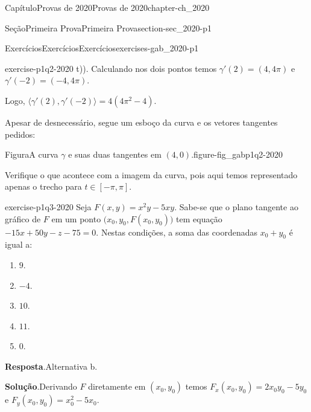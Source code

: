 \documentclass[oneside,10pt,]{book}
\newcommand{\blocktitlefont}{\relax}
\numberwithin{equation}{section}
\begin{document}
\begin{chapterptx}{Capítulo}{Provas de 2020}{}{Provas de 2020}{}{}{chapter-ch_2020}
\begin{sectionptx}{Seção}{Primeira Prova}{}{Primeira Prova}{}{}{section-sec_2020-p1}
\begin{exercises-subsection-numberless}{Exercícios}{Exercícios}{}{Exercícios}{}{}{exercises-gab_2020-p1}
\begin{divisionexercise}{2}{}{}{exercise-p1q2-2020}
t)\big)\). Calculando nos dois pontos temos \(\gamma'(2)=(4,4\pi)\) e \(\gamma'(-2)=(-4,4\pi)\).%
\par
Logo, \(\big\langle\gamma'(2),\gamma'(-2)\big\rangle=4(4\pi^2-4)\).%
\par
Apesar de desnecessário, segue um esboço da curva e os vetores tangentes pedidos: \begin{figureptx}{Figura}{A curva \(\gamma\) e suas duas tangentes em \((4,0)\).}{figure-fig_gabp1q2-2020}{}%
\begin{image}{0.25}{0.5}{0.25}{}%
%
\end{image}%
\tcblower
\end{figureptx}%
%
\par
Verifique o que acontece com a imagem da curva, pois aqui temos representado apenas o trecho para \(t\in[-\pi,\pi]\).%
\end{divisionexercise}%
\begin{divisionexercise}{3}{}{}{exercise-p1q3-2020}%
Seja \(F(x,y)=x^2y-5xy\). Sabe-se que o plano tangente ao gráfico de \(F\) em um ponto \(\big(x_0,y_0,F(x_0,y_0)\big)\) tem equação \(-15x+50y-z-75=0\). Nestas condições, a soma das coordenadas \(x_0+y_0\) é igual a:%
\begin{multicols}{5}
\begin{enumerate}[label=\alph*]
\item{}\(9\).%
\item{}\(-4\).%
\item{}\(10\).%
\item{}\(11\).%
\item{}\(0\).%
\end{enumerate}
\end{multicols}
%
\par\smallskip%
\noindent\textbf{\blocktitlefont Resposta}.\hypertarget{answer-p1q3-2020-b}{}\quad{}Alternativa b.%
\par\smallskip%
\noindent\textbf{\blocktitlefont Solução}.\hypertarget{solution-p1q3-2020-c}{}\quad{}Derivando \(F\) diretamente em \((x_0,y_0)\) temos \(F_x(x_0,y_0)=2x_0y_0-5y_0\) e \(F_y(x_0,y_0)=x^2_0-5x_0\).%

\end{divisionexercise}
\end{exercises-subsection-numberless}
\end{sectionptx}
\end{chapterptx}
\end{document}
